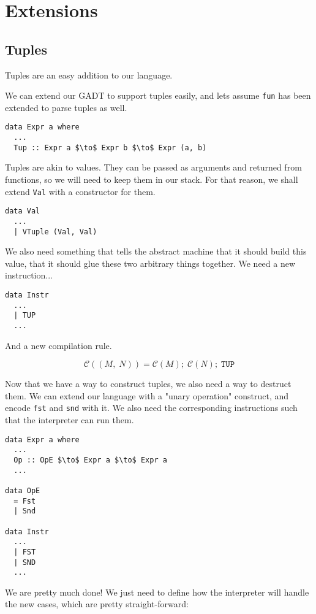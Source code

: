 \section{Extensions}
\subsection{Tuples}
Tuples are an easy addition to our language.

We can extend our GADT to support tuples easily, and lets assume \texttt{fun} has been extended to parse 
tuples as well.

\begin{lstlisting}[mathescape]
data Expr a where
  ...
  Tup :: Expr a $\to$ Expr b $\to$ Expr (a, b)
\end{lstlisting}

Tuples are akin to values. They can be passed as arguments and returned from functions, so we will need
to keep them in our stack. For that reason, we shall extend \texttt{Val} with a constructor for them.

\begin{lstlisting}
data Val
  ...
  | VTuple (Val, Val)
\end{lstlisting}

We also need something that tells the abstract machine that it should build this value, that it should
glue these two arbitrary things together. We need a new instruction...

\begin{lstlisting}
data Instr
  ...
  | TUP
  ...
\end{lstlisting}

And a new compilation rule.

\[ \mathcal{C}((M,\; N)) = \mathcal{C}(M);\; \mathcal{C}(N);\; \texttt{TUP} \]

Now that we have a way to construct tuples, we also need a way to destruct them. We can extend our language
with a "unary operation" construct, and encode \texttt{fst} and \texttt{snd} with it. We also need the corresponding
instructions such that the interpreter can run them.

\begin{lstlisting}[mathescape]
data Expr a where
  ...
  Op :: OpE $\to$ Expr a $\to$ Expr a
  ...

data OpE
  = Fst
  | Snd

data Instr
  ...
  | FST
  | SND
  ...
\end{lstlisting}

We are pretty much done! We just need to define how the interpreter will handle the new cases, which are pretty straight-forward:

